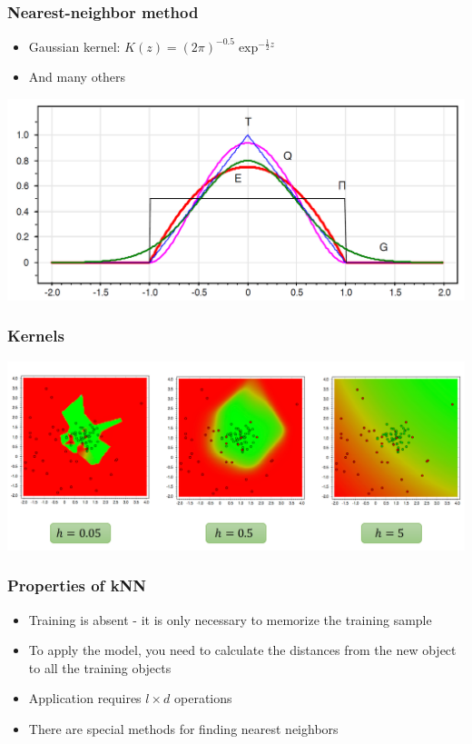 \documentclass[default]{beamer}
\begin{document}
	\begin{frame}
		\frametitle{Nearest-neighbor method}
		\begin{itemize}
			\item Gaussian kernel: $K(z)=(2\pi)^{-0.5}\exp^{-\frac{1}{2}z}$
			\item And many others
		\end{itemize}
		\centering
		\includegraphics[width=\textwidth]{linear_5.png}
	\end{frame}


	\begin{frame}
		\frametitle{Kernels}
		
		\centering
		\includegraphics[width=\textwidth]{linear_6.png}
	\end{frame}

	\begin{frame}
		\frametitle{Properties of kNN}
		
		\begin{itemize}
			\item Training is absent - it is only necessary to memorize the training sample
			\item To apply the model, you need to calculate the distances from the new object to all the training objects
			\item Application requires $l\times d$ operations
			\item There are special methods for finding nearest neighbors
		\end{itemize}
	\end{frame}
\end{document}
